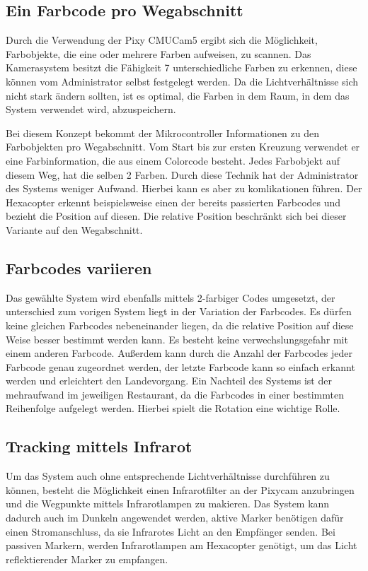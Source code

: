 
  \subsection*{Ein Farbcode pro Wegabschnitt}
  Durch die Verwendung der Pixy CMUCam5 ergibt sich die Möglichkeit, Farbobjekte, die eine oder mehrere Farben aufweisen, zu scannen.
  Das Kamerasystem besitzt die Fähigkeit 7 unterschiedliche Farben zu erkennen, diese können vom Administrator selbst festgelegt werden. Da die Lichtverhältnisse sich nicht stark ändern sollten, ist es optimal, die Farben in dem Raum, in dem das System verwendet wird, abzuspeichern.

  Bei diesem Konzept bekommt der Mikrocontroller Informationen zu den Farbobjekten pro Wegabschnitt. Vom Start bis zur ersten Kreuzung verwendet er eine Farbinformation, die aus einem Colorcode besteht. Jedes Farbobjekt auf diesem Weg, hat die selben 2 Farben. Durch diese Technik hat der Administrator des Systems weniger Aufwand. Hierbei kann es aber zu komlikationen führen. Der Hexacopter erkennt beispielsweise einen der bereits passierten Farbcodes und bezieht die Position auf diesen. Die relative Position beschränkt sich bei dieser Variante auf den Wegabschnitt. 


  \subsection*{Farbcodes variieren}
  Das gewählte System wird ebenfalls mittels 2-farbiger Codes umgesetzt, der unterschied zum vorigen System liegt in der Variation der Farbcodes. Es dürfen keine gleichen Farbcodes nebeneinander liegen, da die relative Position auf diese Weise besser bestimmt werden kann. Es besteht keine verwechslungsgefahr mit einem anderen Farbcode. Außerdem kann durch die Anzahl der Farbcodes jeder Farbcode genau zugeordnet werden, der letzte Farbcode kann so einfach erkannt werden und erleichtert den Landevorgang. 
  Ein Nachteil des Systems ist der mehraufwand im jeweiligen Restaurant, da die Farbcodes in einer bestimmten Reihenfolge aufgelegt werden. Hierbei spielt die Rotation eine wichtige Rolle.


  \subsection*{Tracking mittels Infrarot}
  Um das System auch ohne entsprechende Lichtverhältnisse durchführen zu können, besteht die Möglichkeit einen Infrarotfilter an der Pixycam anzubringen und die Wegpunkte mittels Infrarotlampen zu makieren. Das System kann dadurch auch im Dunkeln angewendet werden, aktive Marker benötigen dafür einen Stromanschluss, da sie Infrarotes Licht an den Empfänger senden. Bei passiven Markern, werden Infrarotlampen am Hexacopter genötigt, um das Licht reflektierender Marker zu empfangen.

